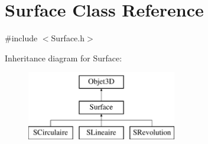 \hypertarget{classSurface}{\section{Surface Class Reference}
\label{classSurface}
}


{\ttfamily \#include $<$Surface.\-h$>$}

Inheritance diagram for Surface\-:\begin{figure}[H]
\begin{center}
\leavevmode
\includegraphics[height=3.000000cm]{classSurface}
\end{center}
\end{figure}
